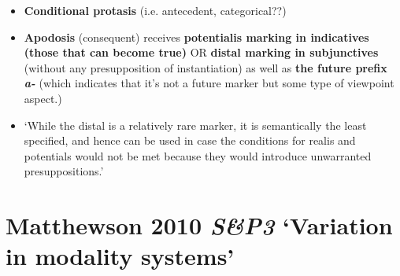 \documentclass[10pt]{article}
\begin{document}
\begin{itemize}
\item \textbf{Conditional protasis} (i.e. antecedent, categorical??)
\item \textbf{Apodosis} (consequent) receives \textbf{potentialis marking in indicatives (those that \textbf{can} become true)} OR \textbf{distal marking in subjunctives} (without any presupposition of instantiation) as well as \textbf{the future prefix \textit{a-}} (which indicates that it's not a future marker but some type of viewpoint aspect.)

\item{\color{ochre}`While the distal is a relatively rare marker, it is semantically the least specified, and hence can be used in case the conditions for realis and potentials would not be met because they would introduce unwarranted presuppositions.'}
	\end{itemize}
\section{Matthewson 2010 \textit{S\&P3} `Variation in modality systems'}
\end{document}
